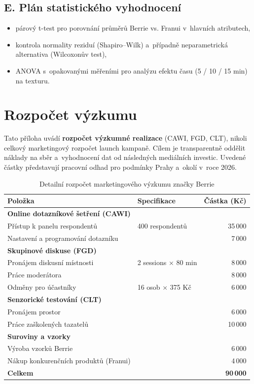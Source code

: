 \section*{E. Plán statistického vyhodnocení}
\begin{itemize}
  \item párový t-test pro porovnání průměrů Berrie vs. Franui v~hlavních atributech,
  \item kontrola normality reziduí (Shapiro--Wilk) a~případně neparametrická alternativa (Wilcoxonův test),
  \item ANOVA s~opakovanými měřeními pro analýzu efektu času (5 / 10 / 15 min) na texturu.
\end{itemize}

\chapter{Rozpočet výzkumu}
\label{app:budget}

Tato příloha uvádí \textbf{rozpočet výzkumné realizace} (CAWI, FGD, CLT), nikoli celkový marketingový rozpočet launch kampaně. Cílem je transparentně oddělit náklady na sběr a~vyhodnocení dat od následných mediálních investic. Uvedené částky představují pracovní odhad pro podmínky Prahy a~okolí v~roce 2026.

\begin{table}[H]
\centering
\caption{Detailní rozpočet marketingového výzkumu značky Berrie}
\label{tab:budget_detail}
\begin{tabularx}{\textwidth}{Xlr}
\toprule
\textbf{Položka} & \textbf{Specifikace} & \textbf{Částka (Kč)} \\
\midrule
\multicolumn{3}{l}{\textbf{Online dotazníkové šetření (CAWI)}} \\
\quad Přístup k panelu respondentů & 400 respondentů & 35\,000 \\
\quad Nastavení a programování dotazníku & & 7\,000 \\
\midrule
\multicolumn{3}{l}{\textbf{Skupinové diskuse (FGD)}} \\
\quad Pronájem diskusní místnosti & 2 sessions × 80 min & 8\,000 \\
\quad Práce moderátora & & 8\,000 \\
\quad Odměny pro účastníky & 16 osob × 375 Kč & 6\,000 \\
\midrule
\multicolumn{3}{l}{\textbf{Senzorické testování (CLT)}} \\
\quad Pronájem prostor & & 6\,000 \\
\quad Práce zaškolených tazatelů & & 10\,000 \\
\midrule
\multicolumn{3}{l}{\textbf{Suroviny a vzorky}} \\
\quad Výroba vzorků Berrie & & 6\,000 \\
\quad Nákup konkurenčních produktů (Franui) & & 4\,000 \\
\midrule
\textbf{Celkem} & & \textbf{90\,000} \\
\bottomrule
\end{tabularx}
\end{table}


